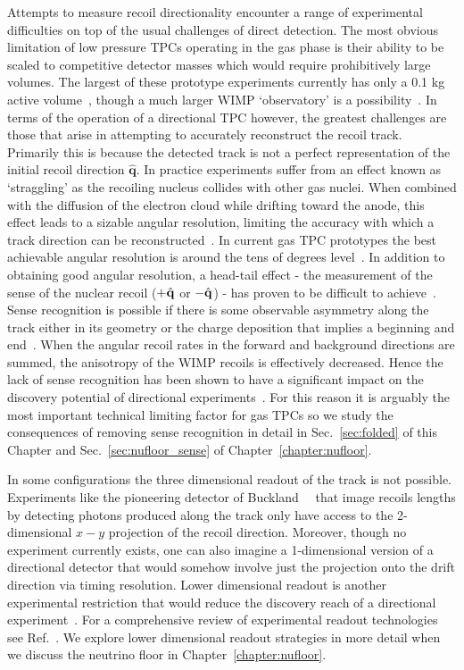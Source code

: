 Attempts to measure recoil directionality encounter a range of experimental difficulties on top of the usual challenges of direct detection. The most obvious limitation of low pressure TPCs operating in the gas phase is their ability to be scaled to competitive detector masses which would require prohibitively large volumes. The largest of these prototype experiments currently has only a 0.1 kg active volume~\cite{Santos:2011kf}, though a much larger WIMP `observatory' is a possibility~\cite{Simpson:2017aaa}. In terms of the operation of a directional TPC however, the greatest challenges are those that arise in attempting to accurately reconstruct the recoil track. Primarily this is because the detected track is not a perfect representation of the initial recoil direction $\hat{\textbf{q}}$. In practice experiments suffer from an effect known as `straggling' as the recoiling nucleus collides with other gas nuclei. When combined with the diffusion of the electron cloud while drifting toward the anode, this effect leads to a sizable angular resolution, limiting the accuracy with which a track direction can be reconstructed~\cite{Billard:2011kv}. In current gas TPC prototypes the best achievable angular resolution is around the tens of degrees level~\cite{Billard:2012bk}. In addition to obtaining good angular resolution, a head-tail effect - the measurement of the sense of the nuclear recoil ($+\hat{\mathbf{q}}$ or $-\hat{\mathbf{q}}$) - has proven to be difficult to achieve~\cite{Billard:2012bk,Majewski:2009an, Dujmic:2008zz}. Sense recognition is possible if there is some observable asymmetry along the track either in its geometry or the charge deposition that implies a beginning and end~\cite{Billard:2011kv}. When the angular recoil rates in the forward and background directions are summed, the anisotropy of the WIMP recoils is effectively decreased. Hence the lack of sense recognition has been shown to have a significant impact on the discovery potential of directional experiments~\cite{Green:2007at,Billard:2014ewa,Morgan:2004ys,Billard:2011zj,Copi:2005ya}. For this reason it is arguably the most important technical limiting factor for gas TPCs so we study the consequences of removing sense recognition in detail in Sec.~\ref{sec:folded} of this Chapter and Sec.~\ref{sec:nufloor_sense} of Chapter~\ref{chapter:nufloor}.

In some configurations the three dimensional readout of the track is not possible. Experiments like the pioneering detector of Buckland~\etal~\cite{Buckland:1994gc, Lehner:1997fs} that image recoils lengths by detecting photons produced along the track only have access to the 2-dimensional $x-y$ projection of the recoil direction. Moreover, though no experiment currently exists, one can also imagine a 1-dimensional version of a directional detector that would somehow involve just the projection onto the drift direction via timing resolution. Lower dimensional readout is another experimental restriction that would reduce the discovery reach of a directional experiment~\cite{Billard:2014ewa}. For a comprehensive review of experimental readout technologies see Ref.~\cite{Battat:2016pap}. We explore lower dimensional readout strategies in more detail when we discuss the neutrino floor in Chapter~\ref{chapter:nufloor}.

